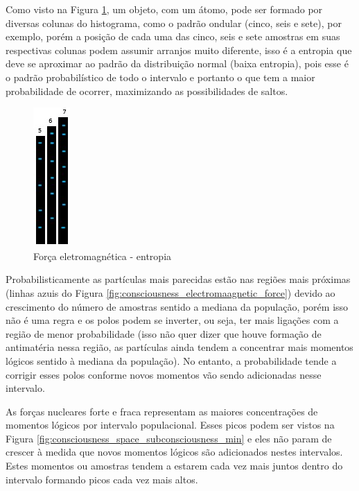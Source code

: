 Como visto na Figura \ref{fig:consciousness_electromaagnetic_force_entropy}, um objeto, com um átomo, pode ser formado por diversas colunas do histograma, como o padrão ondular (cinco, seis e sete), por exemplo, porém a posição de cada uma das cinco, seis e sete amostras em suas respectivas colunas podem assumir arranjos muito diferente, isso é a entropia que deve se aproximar ao padrão da distribuição normal (baixa entropia), pois esse é o padrão probabilístico de todo o intervalo e portanto o que tem a maior probabilidade de ocorrer, maximizando as possibilidades de saltos.
	\begin{figure}[H]
	\caption{Força eletromagnética - entropia}
	\label{fig:consciousness_electromaagnetic_force_entropy}
	\centering
	\includegraphics[scale=.9]{sections/images/consciousness_electromaagnetic_force_entropy.jpg}
	\end{figure}

Probabilisticamente as partículas mais parecidas estão nas regiões mais próximas (linhas azuis do Figura \ref{fig:consciousness_electromaagnetic_force}) devido ao crescimento do número de amostras sentido a mediana da população, porém isso não é uma regra e os polos podem se inverter, ou seja, ter mais ligações com a região de menor probabilidade (isso não quer dizer que houve formação de antimatéria nessa região, as partículas ainda tendem a concentrar mais momentos lógicos sentido à mediana da população). No entanto, a probabilidade tende a corrigir esses polos conforme novos momentos vão sendo adicionadas nesse intervalo.

As forças nucleares forte e fraca representam as maiores concentrações de momentos lógicos por intervalo populacional. Esses picos podem ser vistos na Figura \ref{fig:consciousness_space_subconsciousness_min} e eles não param de crescer à medida que novos momentos lógicos são adicionados nestes intervalos. Estes momentos ou amostras tendem a estarem cada vez mais juntos dentro do intervalo formando picos cada vez mais altos.

